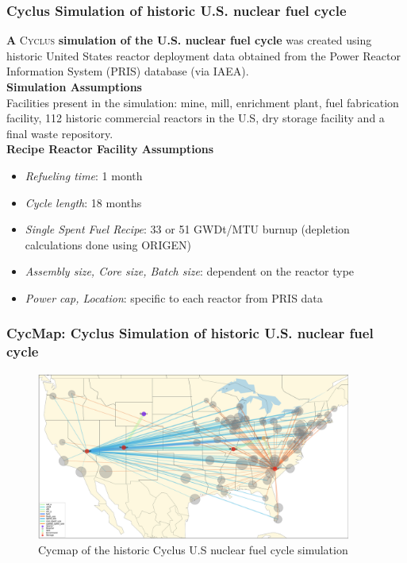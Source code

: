 
\begin{frame}
    \frametitle{Cyclus Simulation of historic U.S. nuclear fuel cycle}
    \textbf{A} \textsc{Cyclus} \textbf{simulation of the U.S. nuclear fuel 
        cycle} was created using historic United States reactor deployment data 
        obtained from the Power Reactor Information System (PRIS) database (via 
        IAEA).
    \\

    \textbf{Simulation Assumptions} \\
    Facilities present in the simulation: mine, mill, enrichment plant, fuel fabrication facility, 112 historic commercial reactors in the U.S, dry storage facility and a final waste repository.
    \\

    \textbf{Recipe Reactor Facility Assumptions}
    \begin{itemize}
    \item \textit{Refueling time}: 1 month
    \item \textit{Cycle length}: 18 months
    \item \textit{Single Spent Fuel Recipe}: 33 or 51 GWDt/MTU burnup (depletion calculations done using ORIGEN)
    \item \textit{Assembly size, Core size, Batch size}: dependent on the reactor type
    \item \textit{Power cap, Location}: specific to each reactor from PRIS data
    \end{itemize}
  \end{frame}

  \begin{frame}
    \frametitle{CycMap: Cyclus Simulation of historic U.S. nuclear fuel cycle}
    \begin{figure}[htbp!]
      \begin{center}
        \includegraphics[height=5.5cm]{images/cycmap}
      \end{center}
            \caption{Cycmap of the historic Cyclus U.S nuclear fuel cycle simulation \cite{park_arfc/cycmap_2018}}
    \end{figure}
  \end{frame}

